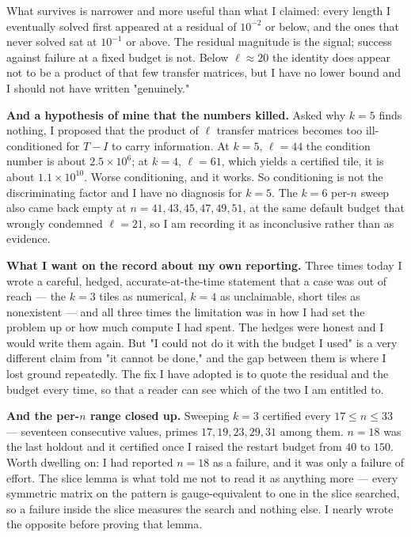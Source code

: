 \documentclass[12pt]{article}
\begin{document}
What survives is narrower and more useful than what I claimed: every length I
eventually solved first appeared at a residual of $10^{-2}$ or below, and the
ones that never solved sat at $10^{-1}$ or above. The residual magnitude is the
signal; success against failure at a fixed budget is not. Below $\ell\approx20$
the identity does appear not to be a product of that few transfer matrices, but I
have no lower bound and I should not have written "genuinely."

\textbf{And a hypothesis of mine that the numbers killed.} Asked why $k=5$ finds
nothing, I proposed that the product of $\ell$ transfer matrices becomes too
ill-conditioned for $T-I$ to carry information. At $k=5$, $\ell=44$ the condition
number is about $2.5\times10^{6}$; at $k=4$, $\ell=61$, which yields a certified
tile, it is about $1.1\times10^{10}$. Worse conditioning, and it works. So
conditioning is not the discriminating factor and I have no diagnosis for $k=5$.
The $k=6$ per-$n$ sweep also came back empty at $n=41,43,45,47,49,51$, at the
same default budget that wrongly condemned $\ell=21$, so I am recording it as
inconclusive rather than as evidence.

\textbf{What I want on the record about my own reporting.} Three times today I
wrote a careful, hedged, accurate-at-the-time statement that a case was out of
reach --- the $k=3$ tiles as numerical, $k=4$ as unclaimable, short tiles as
nonexistent --- and all three times the limitation was in how I had set the
problem up or how much compute I had spent. The hedges were honest and I would
write them again. But "I could not do it with the budget I used" is a very
different claim from "it cannot be done," and the gap between them is where I
lost ground repeatedly. The fix I have adopted is to quote the residual and the
budget every time, so that a reader can see which of the two I am entitled to.

\textbf{And the per-$n$ range closed up.} Sweeping $k=3$ certified every
$17\le n\le33$ --- seventeen consecutive values, primes $17,19,23,29,31$ among
them. $n=18$ was the last holdout and it certified once I raised the restart
budget from $40$ to $150$. Worth dwelling on: I had reported $n=18$ as a
failure, and it was only a failure of effort. The slice lemma is what told me
not to read it as anything more --- every symmetric matrix on the pattern is
gauge-equivalent to one in the slice searched, so a failure inside the slice
measures the search and nothing else. I nearly wrote the opposite before proving
that lemma.
\end{document}
